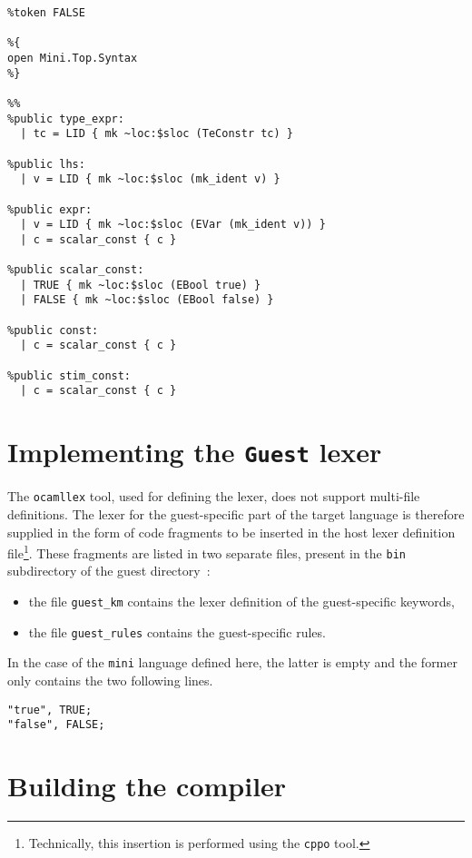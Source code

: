 \begin{lstlisting}[language={menhir},frame=single,basicstyle=\small,caption={File
    guest_parser.mly},label={lst:mini-eval}]
%token TRUE
%token FALSE

%{
open Mini.Top.Syntax
%}

%%
%public type_expr:
  | tc = LID { mk ~loc:$sloc (TeConstr tc) }

%public lhs:
  | v = LID { mk ~loc:$sloc (mk_ident v) }

%public expr:
  | v = LID { mk ~loc:$sloc (EVar (mk_ident v)) }
  | c = scalar_const { c }

%public scalar_const:
  | TRUE { mk ~loc:$sloc (EBool true) }
  | FALSE { mk ~loc:$sloc (EBool false) }

%public const:
  | c = scalar_const { c }

%public stim_const: 
  | c = scalar_const { c }

\end{lstlisting}

\section{Implementing the \texttt{Guest} lexer}

The \texttt{ocamllex} tool, used for defining the lexer, does not support multi-file definitions.
The lexer for the guest-specific part of the target language is therefore supplied in the form of
code fragments to be inserted in the host lexer definition file\footnote{Technically, this insertion is
  performed using the \texttt{cppo} tool.}. These fragments are listed in two separate files,
present in the \texttt{bin} subdirectory of the guest directory~:
\begin{itemize}
\item the file \texttt{guest_km} contains the lexer definition of the guest-specific keywords,
\item the file \texttt{guest_rules} contains the guest-specific rules.
\end{itemize}

In the case of the \texttt{mini} language defined here, the latter is empty and the former only
contains the two following lines.

\begin{verbatim}
"true", TRUE;
"false", FALSE;
\end{verbatim}

\section{Building the compiler}

